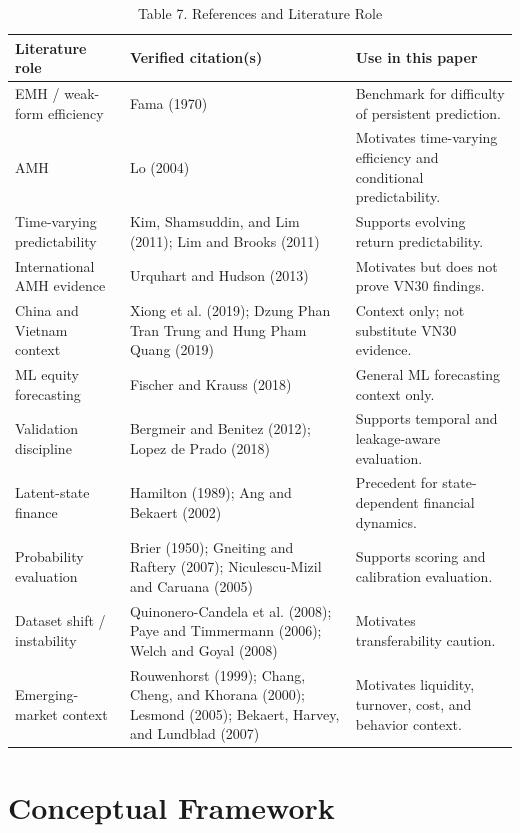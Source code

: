 \documentclass[12pt,a4paper]{article}
\begin{document}
\begin{table}[H]
\centering
\caption{Table 7. References and Literature Role}
\label{tab:literature-role}
\small
\begin{adjustbox}{width=\textwidth}
\begin{tabular}{L{0.25\textwidth} L{0.36\textwidth} L{0.34\textwidth}}
\toprule
Literature role & Verified citation(s) & Use in this paper \\
\midrule
EMH / weak-form efficiency & Fama (1970) & Benchmark for difficulty of persistent prediction. \\
AMH & Lo (2004) & Motivates time-varying efficiency and conditional predictability. \\
Time-varying predictability & Kim, Shamsuddin, and Lim (2011); Lim and Brooks (2011) & Supports evolving return predictability. \\
International AMH evidence & Urquhart and Hudson (2013) & Motivates but does not prove VN30 findings. \\
China and Vietnam context & Xiong et al. (2019); Dzung Phan Tran Trung and Hung Pham Quang (2019) & Context only; not substitute VN30 evidence. \\
ML equity forecasting & Fischer and Krauss (2018) & General ML forecasting context only. \\
Validation discipline & Bergmeir and Benitez (2012); Lopez de Prado (2018) & Supports temporal and leakage-aware evaluation. \\
Latent-state finance & Hamilton (1989); Ang and Bekaert (2002) & Precedent for state-dependent financial dynamics. \\
Probability evaluation & Brier (1950); Gneiting and Raftery (2007); Niculescu-Mizil and Caruana (2005) & Supports scoring and calibration evaluation. \\
Dataset shift / instability & Quinonero-Candela et al. (2008); Paye and Timmermann (2006); Welch and Goyal (2008) & Motivates transferability caution. \\
Emerging-market context & Rouwenhorst (1999); Chang, Cheng, and Khorana (2000); Lesmond (2005); Bekaert, Harvey, and Lundblad (2007) & Motivates liquidity, turnover, cost, and behavior context. \\
\bottomrule
\end{tabular}
\end{adjustbox}
\end{table}

\section{Conceptual Framework}
\end{document}
